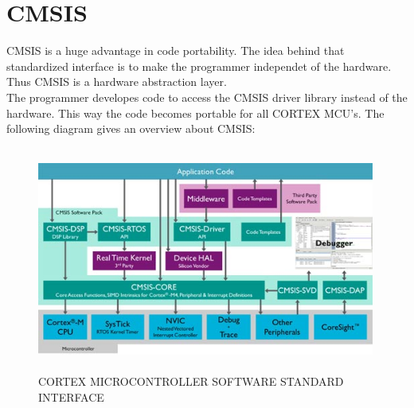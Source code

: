 \chapter{CMSIS}
CMSIS is a huge advantage in code portability. The idea behind that standardized
interface is to make the programmer independet of the hardware. Thus CMSIS is a
hardware abstraction layer.\\
The programmer developes code to access the CMSIS driver library instead of the
hardware. This way the code becomes portable for all CORTEX MCU's.
The following diagram gives an overview about CMSIS:\citep{ARM-CMSIS}\\

\begin{figure}[ht]
	\centering
	\includegraphics[width=420px, height=280px]{../img/cmsis.jpg}
	\caption{CORTEX MICROCONTROLLER SOFTWARE STANDARD INTERFACE}
	\label{cmsis_}
\end{figure}
